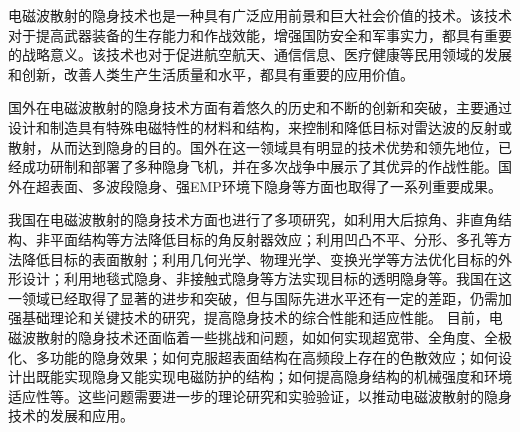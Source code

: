 \documentclass{article}
\begin{document}
电磁波散射的隐身技术也是一种具有广泛应用前景和巨大社会价值的技术。该技术对于提高武器装备的生存能力和作战效能，增强国防安全和军事实力，都具有重要的战略意义。该技术也对于促进航空航天、通信信息、医疗健康等民用领域的发展和创新，改善人类生产生活质量和水平，都具有重要的应用价值。

国外在电磁波散射的隐身技术方面有着悠久的历史和不断的创新和突破，主要通过设计和制造具有特殊电磁特性的材料和结构，来控制和降低目标对雷达波的反射或散射，从而达到隐身的目的。国外在这一领域具有明显的技术优势和领先地位，已经成功研制和部署了多种隐身飞机，并在多次战争中展示了其优异的作战性能。国外在超表面、多波段隐身、强EMP环境下隐身等方面也取得了一系列重要成果。

我国在电磁波散射的隐身技术方面也进行了多项研究，如利用大后掠角、非直角结构、非平面结构等方法降低目标的角反射器效应；利用凹凸不平、分形、多孔等方法降低目标的表面散射；利用几何光学、物理光学、变换光学等方法优化目标的外形设计；利用地毯式隐身、非接触式隐身等方法实现目标的透明隐身等。我国在这一领域已经取得了显著的进步和突破，但与国际先进水平还有一定的差距，仍需加强基础理论和关键技术的研究，提高隐身技术的综合性能和适应性能。
目前，电磁波散射的隐身技术还面临着一些挑战和问题，如如何实现超宽带、全角度、全极化、多功能的隐身效果；如何克服超表面结构在高频段上存在的色散效应；如何设计出既能实现隐身又能实现电磁防护的结构；如何提高隐身结构的机械强度和环境适应性等。这些问题需要进一步的理论研究和实验验证，以推动电磁波散射的隐身技术的发展和应用。
\end{document}
